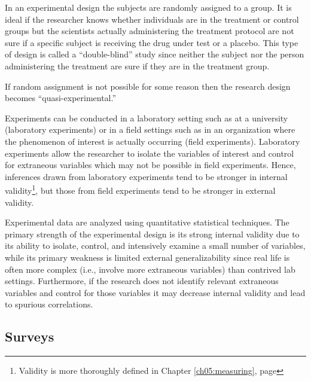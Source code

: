 In an experimental design the subjects are randomly assigned to a group. It is ideal if the researcher knows whether individuals are in the treatment or control groups but the scientists actually administering the treatment protocol are not sure if a specific subject is receiving the drug under test or a placebo. This type of design is called a ``double-blind'' study since neither the subject nor the person administering the treatment are sure if they are in the treatment group.

If random assignment is not possible for some reason then the research design becomes ``quasi-experimental.''

Experiments can be conducted in a laboratory setting such as at a university (laboratory experiments) or in a field settings such as in an organization where the phenomenon of interest is actually occurring (field experiments). Laboratory experiments allow the researcher to isolate the variables of interest and control for extraneous variables which may not be possible in field experiments. Hence, inferences drawn from laboratory experiments tend to be stronger in internal \gls{validity}\footnote{Validity is more thoroughly defined in Chapter \ref{ch05:measuring}, page \pageref{ch05:measuring}}, but those from field experiments tend to be stronger in external validity. 

Experimental data are analyzed using quantitative statistical techniques. The primary strength of the experimental design is its strong internal validity due to its ability to isolate, control, and intensively examine a small number of variables, while its primary weakness is limited external generalizability since real life is often more complex (i.e., involve more extraneous variables) than contrived lab settings. Furthermore, if the research does not identify relevant extraneous variables and control for those variables it may decrease internal validity and lead to spurious correlations.

\subsection{Surveys}

